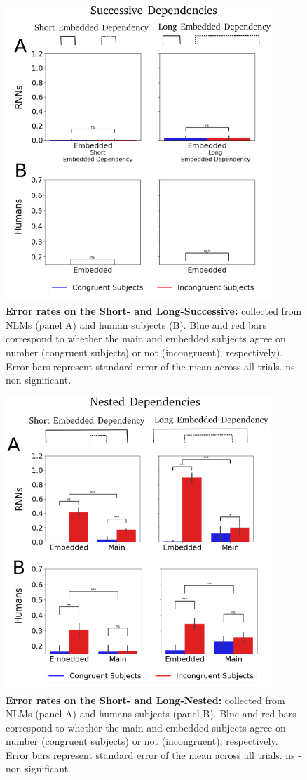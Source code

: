 \begin{figure}[h]
    \centering
    \includegraphics[width=10cm]{figures/error_rates_successive.png}
    \caption{\textbf{Error rates on the Short- and Long-Successive:} collected from NLMs (panel A) and human subjects (B). Blue and red bars correspond to whether the main and embedded subjects agree on number (congruent subjects) or not (incongruent), respectively). Error bars represent standard error of the mean across all trials. ns - non significant.}
    \label{fig:SC_results}
\end{figure}


\begin{figure}[h]
    \centering
    \includegraphics[width=10cm]{figures/error_rates_nested.png}
    \caption{\textbf{Error rates on the Short- and Long-Nested:} collected from NLMs (panel A) and humans subjects (panel B). Blue and red bars correspond to whether the main and embedded subjects agree on number (congruent subjects) or not (incongruent), respectively. Error bars represent standard error of the mean across all trials. ns - non significant.}
    \label{fig:objRC_results}
\end{figure}

